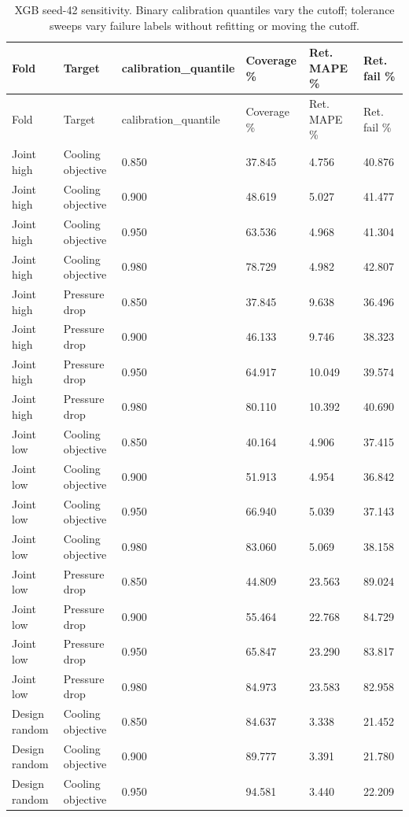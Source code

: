 \begingroup\small\setlength{\tabcolsep}{3pt}\begin{longtable}{llllll}
\caption{XGB seed-42 sensitivity. Binary calibration quantiles vary the cutoff; tolerance sweeps vary failure labels without refitting or moving the cutoff.}\label{tab:ubend-binary_sweep}\\\toprule
Fold & Target & calibration\_quantile & Coverage \% & Ret. MAPE \% & Ret. fail \%\\\midrule
\endfirsthead\toprule
Fold & Target & calibration\_quantile & Coverage \% & Ret. MAPE \% & Ret. fail \%\\\midrule
\endhead
Joint high & Cooling objective & 0.850 & 37.845 & 4.756 & 40.876\\
Joint high & Cooling objective & 0.900 & 48.619 & 5.027 & 41.477\\
Joint high & Cooling objective & 0.950 & 63.536 & 4.968 & 41.304\\
Joint high & Cooling objective & 0.980 & 78.729 & 4.982 & 42.807\\
Joint high & Pressure drop & 0.850 & 37.845 & 9.638 & 36.496\\
Joint high & Pressure drop & 0.900 & 46.133 & 9.746 & 38.323\\
Joint high & Pressure drop & 0.950 & 64.917 & 10.049 & 39.574\\
Joint high & Pressure drop & 0.980 & 80.110 & 10.392 & 40.690\\
Joint low & Cooling objective & 0.850 & 40.164 & 4.906 & 37.415\\
Joint low & Cooling objective & 0.900 & 51.913 & 4.954 & 36.842\\
Joint low & Cooling objective & 0.950 & 66.940 & 5.039 & 37.143\\
Joint low & Cooling objective & 0.980 & 83.060 & 5.069 & 38.158\\
Joint low & Pressure drop & 0.850 & 44.809 & 23.563 & 89.024\\
Joint low & Pressure drop & 0.900 & 55.464 & 22.768 & 84.729\\
Joint low & Pressure drop & 0.950 & 65.847 & 23.290 & 83.817\\
Joint low & Pressure drop & 0.980 & 84.973 & 23.583 & 82.958\\
Design random & Cooling objective & 0.850 & 84.637 & 3.338 & 21.452\\
Design random & Cooling objective & 0.900 & 89.777 & 3.391 & 21.780\\
Design random & Cooling objective & 0.950 & 94.581 & 3.440 & 22.209\\

\end{longtable}
